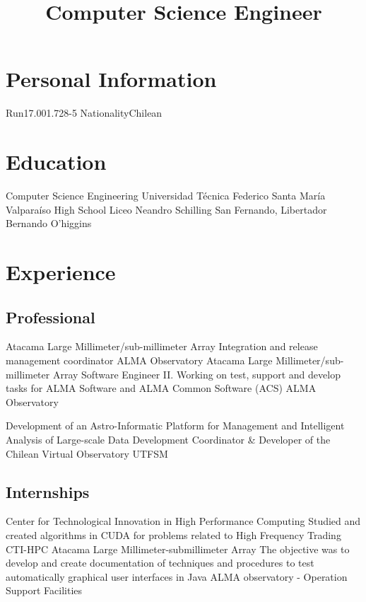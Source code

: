 \documentclass[11pt,a4paper]{moderncv}
\title{Computer Science Engineer}
\begin{document}
\maketitle

\section{Personal Information}
		{Run}{17.001.728-5}
						{Nationality}{Chilean}
							{}{}

\section{Education}
	{Computer Science Engineering}
	{Universidad Técnica Federico Santa María}
	{Valparaíso}
	{}
	{}
	{High School}
	{Liceo Neandro Schilling}
	{San Fernando, Libertador Bernando O'higgins}
	{}{}
\vspace{0.5cm}

\section{Experience}
\subsection{Professional}
	{Atacama Large Millimeter/sub-millimeter Array}
	{Integration and release management coordinator}
	{ALMA Observatory}
	{}{}
	{Atacama Large Millimeter/sub-millimeter Array}
	{Software Engineer II. Working on test, support and develop tasks for ALMA Software and ALMA Common Software (ACS)}
	{ALMA Observatory}
	{}{}

	{Development of an Astro-Informatic Platform for Management and Intelligent Analysis of Large-scale Data}
	{Development Coordinator \& Developer of the Chilean Virtual Observatory}
	{UTFSM}
	{}{}

\subsection{Internships}
	{Center for Technological Innovation in High Performance Computing}
	{Studied and created algorithms in CUDA for problems related to High Frequency Trading}
	{CTI-HPC}
	{}{}
	{Atacama Large Millimeter-submillimeter Array}
	{The objective was to develop and create documentation of techniques and
	procedures to test automatically graphical user interfaces in Java}
	{ALMA observatory - Operation Support Facilities}
	{}{}
\end{document}
